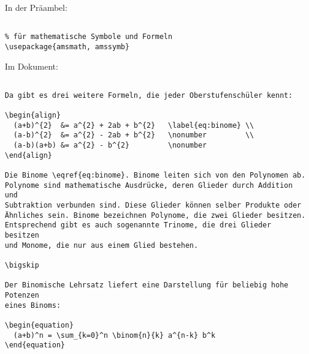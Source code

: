 
In der Präambel:

\begin{verbatim}

% für mathematische Symbole und Formeln
\usepackage{amsmath, amssymb}

\end{verbatim}

\tcblower

Im Dokument: 

\begin{verbatim}

Da gibt es drei weitere Formeln, die jeder Oberstufenschüler kennt: 

\begin{align}
  (a+b)^{2}  &= a^{2} + 2ab + b^{2}   \label{eq:binome} \\
  (a-b)^{2}  &= a^{2} - 2ab + b^{2}   \nonumber         \\
  (a-b)(a+b) &= a^{2} - b^{2}         \nonumber
\end{align}

Die Binome \eqref{eq:binome}. Binome leiten sich von den Polynomen ab. 
Polynome sind mathematische Ausdrücke, deren Glieder durch Addition und 
Subtraktion verbunden sind. Diese Glieder können selber Produkte oder 
Ähnliches sein. Binome bezeichnen Polynome, die zwei Glieder besitzen. 
Entsprechend gibt es auch sogenannte Trinome, die drei Glieder besitzen 
und Monome, die nur aus einem Glied bestehen. 

\bigskip 

Der Binomische Lehrsatz liefert eine Darstellung für beliebig hohe Potenzen 
eines Binoms:

\begin{equation}
  (a+b)^n = \sum_{k=0}^n \binom{n}{k} a^{n-k} b^k
\end{equation}

\end{verbatim}
